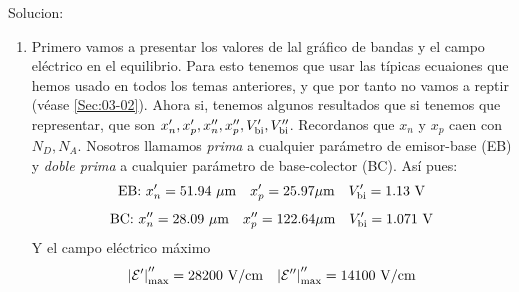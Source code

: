 \vspace*{1em}

Solucion: 

\begin{enumerate}[label=\alph*)]
    \item Primero vamos a presentar los valores de lal gráfico de bandas y el campo eléctrico en el equilibrio. Para esto tenemos que usar las típicas ecuaiones que hemos usado en todos los temas anteriores, y que por tanto no vamos a reptir (véase \ref{Sec:03-02}). Ahora si, tenemos algunos resultados que si tenemos que representar, que son $x_n',x_p',x_n'',x_p'',V_{\text{bi}}',V_{\text{bi}}''$. Recordanos que $x_n$ y $x_p$ caen con $N_D,N_A$.  Nosotros llamamos \textit{prima} a cualquier parámetro de emisor-base (EB) y \textit{doble prima} a cualquier parámetro de base-colector (BC). Así pues:
    \begin{equation}
        \text{EB:} \ x_n'=51.94 \ \mu \unit{m} \quad  x_p'=25.97  \mu \unit{m} \quad \Vbi'=1.13 \ \unit{V}
    \end{equation}
    \begin{equation}
        \text{BC:} \ x_n''=28.09 \ \mu \unit{m} \quad  x_p''=122.64  \mu \unit{m} \quad \Vbi'= 1.071 \ \unit{V}
    \end{equation}
    Y el campo eléctrico máximo
    \begin{equation}
       \abs{\Ecal'}_{\max}''=28200 \ \unit{V/cm} \quad  
       \abs{\Ecal''}_{\max}''=14100 \ \unit{V/cm} 
    \end{equation}


\end{enumerate}
